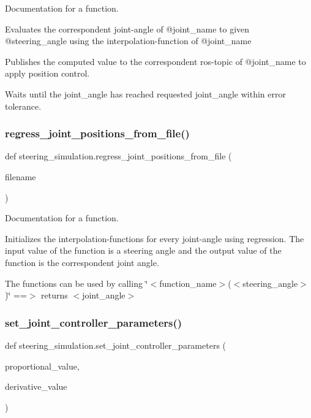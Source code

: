 Documentation for a function. 

Evaluates the correspondent joint-\/angle of @joint\+\_\+name to given @steering\+\_\+angle using the interpolation-\/function of @joint\+\_\+name

Publishes the computed value to the correspondent ros-\/topic of @joint\+\_\+name to apply position control.

Waits until the joint\+\_\+angle has reached requested joint\+\_\+angle within error tolerance. \mbox{\label{namespacesteering__simulation_af85ca971fcf35d30c3647fb0c3732195}} 
\subsubsection{\texorpdfstring{regress\_joint\_positions\_from\_file()}{regress\_joint\_positions\_from\_file()}}
{\footnotesize\ttfamily def steering\+\_\+simulation.\+regress\+\_\+joint\+\_\+positions\+\_\+from\+\_\+file (\begin{DoxyParamCaption}\item[{}]{filename }\end{DoxyParamCaption})}



Documentation for a function. 

Initializes the interpolation-\/functions for every joint-\/angle using regression. The input value of the function is a steering angle and the output value of the function is the correspondent joint angle.

The functions can be used by calling \char`\"{}$<$function\+\_\+name$>$($<$steering\+\_\+angle$>$)\char`\"{} ==$>$ returns $<$joint\+\_\+angle$>$ \mbox{\label{namespacesteering__simulation_a787fcfa65451a11a9f94afaea6a6e809}} 
\subsubsection{\texorpdfstring{set\_joint\_controller\_parameters()}{set\_joint\_controller\_parameters()}}
{\footnotesize\ttfamily def steering\+\_\+simulation.\+set\+\_\+joint\+\_\+controller\+\_\+parameters (\begin{DoxyParamCaption}\item[{}]{proportional\+\_\+value,  }\item[{}]{derivative\+\_\+value }\end{DoxyParamCaption})}



